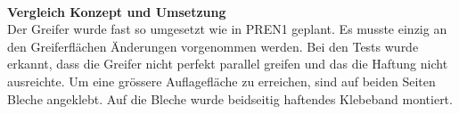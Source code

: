 \\
\textbf{Vergleich Konzept und Umsetzung}\\[0.2cm]
Der Greifer wurde fast so umgesetzt wie in PREN1 geplant. Es musste einzig an den Greiferflächen Änderungen vorgenommen werden. Bei den Tests wurde erkannt, dass die Greifer nicht perfekt parallel greifen und das die Haftung nicht ausreichte. Um eine grössere Auflagefläche zu erreichen, sind auf beiden Seiten Bleche angeklebt. Auf die Bleche wurde beidseitig haftendes Klebeband montiert.